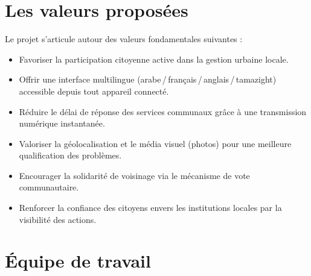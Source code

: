 \documentclass[12pt,a4paper]{report}
\begin{document}
\section{Les valeurs proposées}

Le projet s'articule autour des valeurs fondamentales suivantes :

\begin{itemize}
  \item Favoriser la participation citoyenne active dans la gestion urbaine locale.
  \item Offrir une interface multilingue (arabe\,/\,français\,/\,anglais\,/\,tamazight)
        accessible depuis tout appareil connecté.
  \item Réduire le délai de réponse des services communaux grâce à une transmission
        numérique instantanée.
  \item Valoriser la géolocalisation et le média visuel (photos) pour une meilleure
        qualification des problèmes.
  \item Encourager la solidarité de voisinage via le mécanisme de vote communautaire.
  \item Renforcer la confiance des citoyens envers les institutions locales par la
        visibilité des actions.
\end{itemize}

\section{Équipe de travail}
\end{document}

